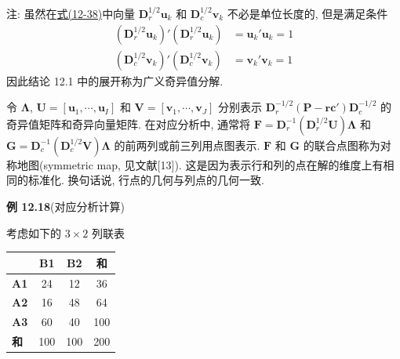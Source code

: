 
注: 虽然在\hyperref[eq:12-38]{式(12-38)}中向量 $\mathbf{D}_r^{1/2}\mathbf{u}_k$ 和 $\mathbf{D}_c^{1/2}\mathbf{v}_k$ 不必是单位长度的, 但是满足条件
\[
\begin{aligned}
(\mathbf{D}_r^{1/2}\mathbf{u}_k)'(\mathbf{D}_r^{1/2}\mathbf{u}_k)&=\mathbf{u}_k'\mathbf{u}_k=1\\
(\mathbf{D}_c^{1/2}\mathbf{v}_k)'(\mathbf{D}_c^{1/2}\mathbf{v}_k)&=\mathbf{v}_k'\mathbf{v}_k=1
\end{aligned}
\]
因此结论 12.1 中的展开称为广义奇异值分解.

令 $\boldsymbol{\Lambda}$, $\mathbf{U}=[\mathbf{u}_1,\cdots,\mathbf{u}_I]$ 和 $\mathbf{V}=[\mathbf{v}_1,\cdots,\mathbf{v}_J]$ 分别表示 $\mathbf{D}_r^{-1/2}(\mathbf{P}-\mathbf{r}\mathbf{c}')\mathbf{D}_c^{-1/2}$ 的奇异值矩阵和奇异向量矩阵. 在对应分析中, 通常将 $\mathbf{F}=\mathbf{D}_r^{-1}(\mathbf{D}_r^{1/2}\mathbf{U})\boldsymbol{\Lambda}$ 和 $\mathbf{G}=\mathbf{D}_c^{-1}(\mathbf{D}_c^{1/2}\mathbf{V})\boldsymbol{\Lambda}$ 的前两列或前三列用点图表示. $\mathbf{F}$ 和 $\mathbf{G}$ 的联合点图称为对称地图(symmetric map, 见文献[13]). 这是因为表示行和列的点在解的维度上有相同的标准化. 换句话说, 行点的几何与列点的几何一致.

\noindent\textbf{例 12.18}\quad (对应分析计算)

考虑如下的 $3\times 2$ 列联表

\begin{mvtable}
\begin{tabular}{lccc}
\toprule
& \textbf{B1} & \textbf{B2} & \textbf{和} \\
\midrule
\textbf{A1} & 24 & 12 & 36 \\
\textbf{A2} & 16 & 48 & 64 \\
\textbf{A3} & 60 & 40 & 100 \\
\midrule
\textbf{和} & 100 & 100 & 200 \\
\bottomrule
\end{tabular}
\end{mvtable}

